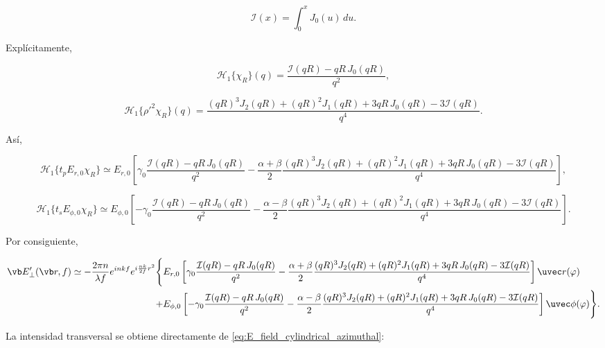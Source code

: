 \begin{equation}
\mathcal I(x)
=
\int_0^x J_0(u)\,du.
\label{eq:Lommel_I_def}
\end{equation}

Explícitamente,

\begin{equation}
\mathscr H_1\{\chi_R\}(q)
=
\frac{
\mathcal I(qR)-qR\,J_0(qR)
}
{q^2},
\label{eq:H1_chiR}
\end{equation}

\begin{equation}
\mathscr H_1\{\rho'^2\chi_R\}(q)
=
\frac{
(qR)^3 J_2(qR)
+
(qR)^2 J_1(qR)
+
3qR\,J_0(qR)
-
3\mathcal I(qR)
}
{q^4}.
\label{eq:H1_rho2_chiR}
\end{equation}

Así,

\begin{equation}
\mathscr H_1\{t_pE_{r,0}\chi_R\}
\simeq
E_{r,0}
\left[
\gamma_0
\frac{\mathcal I(qR)-qR\,J_0(qR)}{q^2}
-
\frac{\alpha+\beta}{2}
\frac{
(qR)^3 J_2(qR)
+
(qR)^2 J_1(qR)
+
3qR\,J_0(qR)
-
3\mathcal I(qR)
}
{q^4}
\right],
\label{eq:H1_tp_Er_homogeneous}
\end{equation}

\begin{equation}
\mathscr H_1\{t_sE_{\phi,0}\chi_R\}
\simeq
E_{\phi,0}
\left[
-\gamma_0
\frac{\mathcal I(qR)-qR\,J_0(qR)}{q^2}
-
\frac{\alpha-\beta}{2}
\frac{
(qR)^3 J_2(qR)
+
(qR)^2 J_1(qR)
+
3qR\,J_0(qR)
-
3\mathcal I(qR)
}
{q^4}
\right].
\label{eq:H1_ts_Ephi_homogeneous}
\end{equation}

Por consiguiente,

\begin{equation}
\begin{aligned}
\vb E'_\perp(\vb r,f)
\simeq
-\frac{2\pi n}{\lambda f}
e^{inkf}e^{i\frac{nk}{2f}r^2}
\Bigg\{
&
E_{r,0}
\left[
\gamma_0
\frac{\mathcal I(qR)-qR\,J_0(qR)}{q^2}
-
\frac{\alpha+\beta}{2}
\frac{
(qR)^3 J_2(qR)
+
(qR)^2 J_1(qR)
+
3qR\,J_0(qR)
-
3\mathcal I(qR)
}
{q^4}
\right]\uvec r(\varphi)
\\
+
&
E_{\phi,0}
\left[
-\gamma_0
\frac{\mathcal I(qR)-qR\,J_0(qR)}{q^2}
-
\frac{\alpha-\beta}{2}
\frac{
(qR)^3 J_2(qR)
+
(qR)^2 J_1(qR)
+
3qR\,J_0(qR)
-
3\mathcal I(qR)
}
{q^4}
\right]\uvec\phi(\varphi)
\Bigg\}.
\end{aligned}
\label{eq:E_cylindrical_homogeneous}
\end{equation}

La intensidad transversal se obtiene directamente de \eqref{eq:E_field_cylindrical_azimuthal}:

